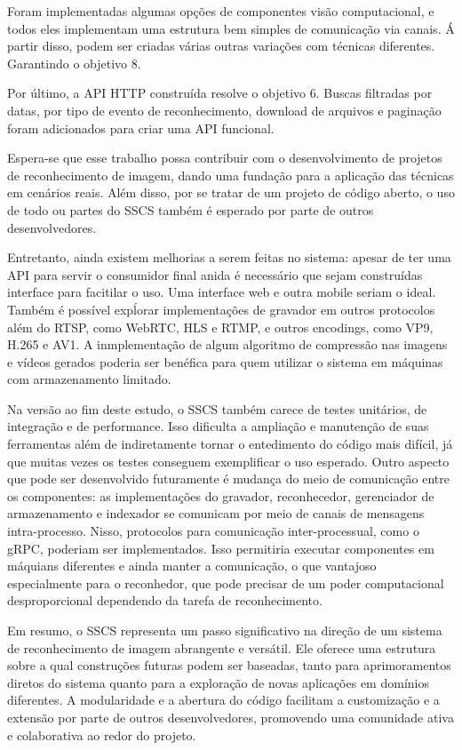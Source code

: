 \documentclass[12pt, %
openright, 
oneside, %
a4paper,    %
brazil]{facom-ufu-abntex2}
\begin{document}
Foram implementadas algumas opções de componentes visão computacional, e todos
eles implementam uma estrutura bem simples de comunicação via canais. Á partir
disso, podem ser criadas várias  outras variações com técnicas diferentes.
Garantindo o objetivo 8.

Por último, a API HTTP construída resolve o objetivo 6. Buscas filtradas por
datas, por tipo de evento de reconhecimento, download de arquivos e paginação
foram adicionados para criar uma API funcional.

Espera-se que esse trabalho possa contribuir com o desenvolvimento de projetos
de reconhecimento de imagem, dando uma fundação para a aplicação das técnicas
em cenários reais. Além disso, por se tratar de um projeto de código aberto, o
uso de todo ou partes do SSCS também é esperado por parte de outros
desenvolvedores.

Entretanto, ainda existem melhorias a serem feitas no sistema: apesar de ter
uma API para servir o consumidor final anida é necessário que sejam construídas
interface para facitilar o uso. Uma interface web e outra mobile seriam o
ideal. Também é possível expĺorar implementações de gravador em outros
protocolos além do RTSP, como WebRTC, HLS e RTMP, e outros encodings, como VP9,
H.265 e AV1. A inmplementação de algum algoritmo de compressão nas imagens e
vídeos gerados poderia ser benéfica para quem utilizar o sistema em máquinas
com armazenamento limitado.

Na versão ao fim deste estudo, o SSCS também carece de testes unitários, de
integração e de performance. Isso dificulta a ampliação e manutenção de suas
ferramentas além de indiretamente tornar o entedimento do código mais difícil,
já que muitas vezes os testes conseguem exemplificar o uso esperado. Outro
aspecto que pode ser desenvolvido futuramente é mudança do meio de comunicação
entre os componentes: as implementações do gravador, reconhecedor, gerenciador
de armazenamento e indexador se comunicam por meio de canais de mensagens
intra-processo. Nisso, protocolos para comunicação inter-processual, como o
gRPC, poderiam ser implementados. Isso permitiria executar componentes em
máquians diferentes e ainda manter a comunicação, o que vantajoso especialmente
para o reconhedor, que pode precisar de um poder computacional desproporcional
dependendo da tarefa de reconhecimento.

Em resumo,  o SSCS representa um passo significativo na direção de um sistema
de reconhecimento de imagem abrangente e versátil. Ele oferece uma estrutura
sobre a qual construções futuras podem ser baseadas, tanto para aprimoramentos
diretos do sistema quanto para a exploração de novas aplicações em domínios
diferentes. A modularidade e a abertura do código facilitam a customização e a
extensão por parte de outros desenvolvedores, promovendo uma comunidade ativa e
colaborativa ao redor do projeto.
\postextual%
\end{document}
